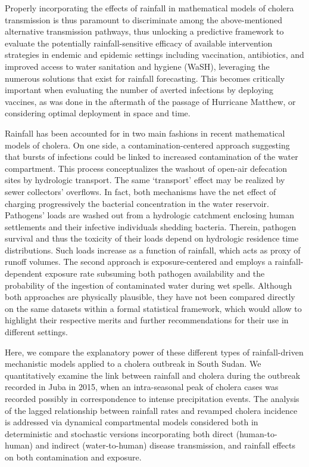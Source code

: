 Properly incorporating the effects of rainfall in mathematical models of cholera transmission is thus paramount to discriminate among the above-mentioned alternative transmission pathways, thus unlocking a predictive framework to evaluate the potentially rainfall-sensitive efficacy of available intervention strategies in endemic and epidemic settings including vaccination, antibiotics, and improved access to water sanitation and hygiene (WaSH), leveraging the numerous solutions that exist for rainfall forecasting\cite{Rinaldo:Reassessment20102011:2012,Bertuzzo:ProbabilityExtinctionHaiti:2016}. This becomes  critically important when evaluating the number of averted infections by deploying vaccines, as was done in the aftermath of the passage of Hurricane Matthew\cite{Pasetto:RealtimeProjectionsCholera:2017}, or considering optimal deployment in space and time.

Rainfall has been accounted for in two main fashions in recent mathematical models of cholera. On one side, a contamination-centered approach suggesting that bursts of infections could be linked to increased contamination of the water compartment\cite{Rinaldo:Reassessment20102011:2012}. This process conceptualizes the washout of open-air defecation sites by hydrologic transport. The same `transport' effect may be realized by sewer collectors' overflows. In fact, both mechanisms have the net effect of charging progressively the bacterial concentration in the water reservoir\cite{Codeco:EndemicEpidemicDynamics:2001}. Pathogens' loads are washed out from a hydrologic catchment enclosing human settlements and their infective individuals shedding bacteria. Therein, pathogen survival and thus the toxicity of their loads depend on hydrologic residence time distributions\cite{Rinaldo:Reassessment20102011:2012,Rinaldo:ModelingKeyDrivers:2017}. Such loads increase as a function of rainfall, which acts as proxy of runoff volumes. The second approach is exposure-centered and employs a rainfall-dependent exposure rate subsuming both pathogen availability and the probability of the ingestion of contaminated water during wet spells\cite{Eisenberg:ExaminingRainfallCholera:2013}. Although both approaches are physically plausible, they have not been compared directly on the same datasets within a formal statistical framework, which would allow to highlight their respective merits and further recommendations for their use in different settings.


Here, we compare the explanatory power of these different types of rainfall-driven mechanistic models applied to a cholera outbreak in South Sudan. We quantitatively examine the link between rainfall and cholera during the outbreak recorded in Juba in 2015, when an intra-seasonal peak of cholera cases was recorded possibly in correspondence to intense precipitation events. The analysis of the lagged relationship between rainfall rates and revamped cholera incidence is addressed via dynamical compartmental models considered both in deterministic and stochastic versions incorporating both direct (human-to-human) and indirect (water-to-human) disease transmission, and rainfall effects on both contamination and exposure.

